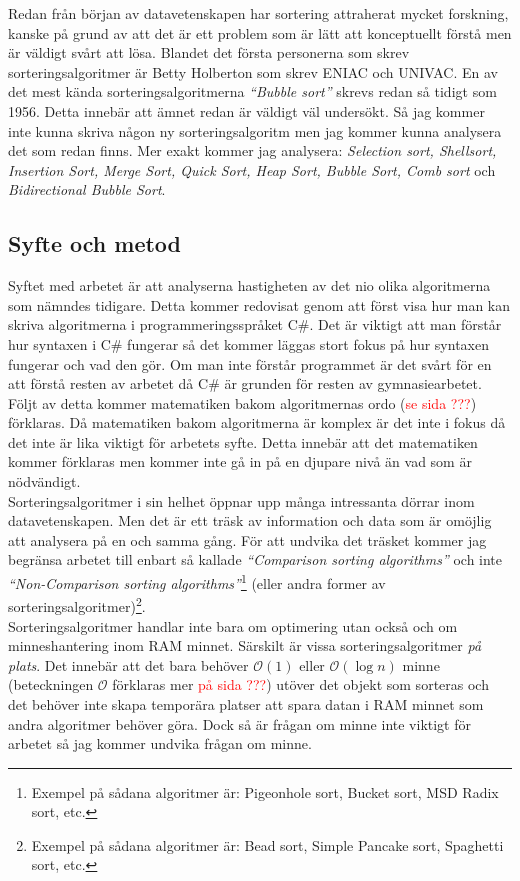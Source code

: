 \documentclass[twocolumn, a4, twoside]{article}
\begin{document}
Redan från början av datavetenskapen har sortering attraherat mycket forskning, kanske på grund av att det är ett problem som är lätt att konceptuellt förstå men är väldigt svårt att lösa. Blandet det första personerna som skrev sorteringsalgoritmer är Betty Holberton som skrev ENIAC och UNIVAC. En av det mest kända sorteringsalgoritmerna \textit{“Bubble sort”} skrevs redan så tidigt som 1956. Detta innebär att ämnet redan är väldigt väl undersökt. Så jag kommer inte kunna skriva någon ny sorteringsalgoritm men jag kommer kunna analysera det som redan finns. \cite{1} Mer exakt kommer jag analysera: \textit{Selection sort, Shellsort, Insertion Sort, Merge Sort, Quick Sort, Heap Sort, Bubble Sort, Comb sort} och \textit{Bidirectional Bubble Sort}.

\subsection{Syfte och metod}
Syftet med arbetet är att analyserna hastigheten av det nio olika algoritmerna som nämndes tidigare. Detta kommer redovisat genom att först visa hur man kan skriva algoritmerna i programmeringsspråket C\#. Det är viktigt att man förstår hur syntaxen i C\# fungerar så det kommer läggas stort fokus på hur syntaxen fungerar och vad den gör. Om man inte förstår programmet är det svårt för en att förstå resten av arbetet då C\# är grunden för resten av gymnasiearbetet. Följt av detta kommer matematiken bakom algoritmernas ordo (\textcolor{red}{se sida ???}) förklaras. Då matematiken bakom algoritmerna är komplex är det inte i fokus då det inte är lika viktigt för arbetets syfte. Detta innebär att det matematiken kommer förklaras men kommer inte gå in på en djupare nivå än vad som är nödvändigt.\\
Sorteringsalgoritmer i sin helhet öppnar upp många intressanta dörrar inom datavetenskapen. Men det är ett träsk av information och data som är omöjlig att analysera på en och samma gång. För att undvika det träsket kommer jag begränsa arbetet till enbart så kallade \textit{“Comparison sorting algorithms”} och inte \textit{“Non-Comparison sorting algorithms”}\footnote{Exempel på sådana algoritmer är: Pigeonhole sort, Bucket sort, MSD Radix sort, etc.} (eller andra former av sorteringsalgoritmer)\footnote{Exempel på sådana algoritmer är: Bead sort, Simple Pancake sort, Spaghetti sort, etc.}.\\
Sorteringsalgoritmer handlar inte bara om optimering utan också och om minneshantering inom RAM minnet. Särskilt är vissa sorteringsalgoritmer \textit{på plats}. Det innebär att det bara behöver $\mathcal{O}(1)$ eller $\mathcal{O}(\log{n})$ minne (beteckningen $\mathcal{O}$ förklaras mer \textcolor{red}{på sida ???}) utöver det objekt som sorteras och det behöver inte skapa temporära platser att spara datan i RAM minnet som andra algoritmer behöver göra. \cite{3} Dock så är frågan om minne inte viktigt för arbetet så jag kommer undvika frågan om minne. 
\end{document}
